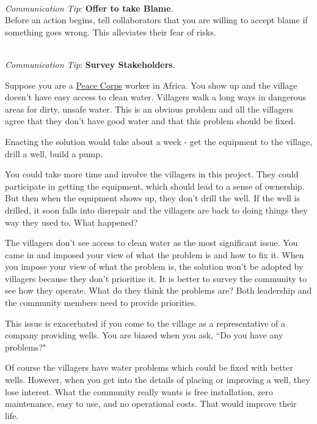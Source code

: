 \ \\
\textit{Communication Tip}: \textbf{Offer to take Blame\label{sec:take-blame}}.\\
Before an action begins, tell collaborators that you are willing to accept blame if something goes wrong. This alleviates their fear of risks.

\ \\
\textit{Communication Tip}: \textbf{Survey Stakeholders}.\\

\begin{mdframed}
Suppose you are a \href{http://www.peacecorps.gov/}{Peace Corps} worker in Africa. 
You show up and the village doesn't have easy access to clean water. Villagers walk a long ways in dangerous areas for dirty, unsafe water. This is an obvious problem and all the villagers agree that they don't have good water and that this problem should be fixed.

Enacting the solution would take about a week - get the equipment to the village, drill a well, build a pump.

You could take more time and involve the villagers in this project. They could participate in getting the equipment, which should lead to a sense of ownership.
But then when the equipment shows up, they don't drill the well. If the well is drilled, it soon falls into disrepair and the villagers are back to doing things they way they used to. What happened?

The villagers don't see access to clean water as the most significant issue. You came in and imposed your view of what the problem is and how to fix it. When you impose your view of what the problem is, the solution won't be adopted by villagers because they don't prioritize it.
It is better to survey the community to see how they operate. What do they think the problems are?
Both leadership and the community members need to provide priorities.

This issue is exacerbated if you come to the village as a representative of a company providing wells. You are biased when you ask, ``Do you have any problems?"

Of course the villagers have water problems which could be fixed with better wells. However, when you get into the details of placing or improving a well, they lose interest. What the community really wants is free installation, zero maintenance, easy to use, and no operational costs. That would improve their life.
\end{mdframed}


